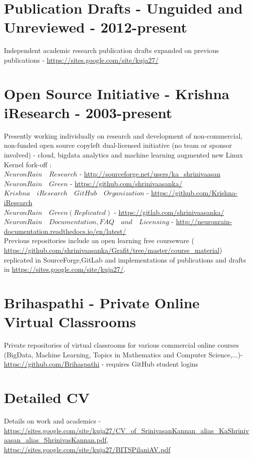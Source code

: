 \documentclass[11pt,onecolumn]{article}
\begin{document}
\section{Publication Drafts - Unguided and Unreviewed - 2012-present}
Independent academic research publication drafts expanded on previous publications - \url {https://sites.google.com/site/kuja27/}

\section{Open Source Initiative - Krishna iResearch - 2003-present}
Presently working individually on research and development of non-commercial, non-funded open source copyleft dual-licensed initiative (no team or sponsor involved) - cloud, bigdata analytics and machine learning augmented new Linux Kernel fork-off $:$ \\
 $NeuronRain \quad Research$ - \url {http://sourceforge.net/users/ka_shrinivaasan} \\
 $NeuronRain \quad Green$ - \url {https://github.com/shrinivaasanka/} \\
 $Krishna \quad iResearch \quad GitHub \quad Organization$ - \url {https://github.com/Krishna-iResearch} \\
  $NeuronRain \quad Green (Replicated)$ - \url {https://gitlab.com/shrinivaasanka/} \\
 $NeuronRain \quad Documentation, FAQ \quad and \quad Licensing$ - \url {http://neuronrain-documentation.readthedocs.io/en/latest/} \\
Previous repositories include an open learning free courseware ( \url {https://github.com/shrinivaasanka/Grafit/tree/master/course_material})  replicated in SourceForge,GitLab and implementations of publications and drafts in \url {https://sites.google.com/site/kuja27/}.

\section{Brihaspathi - Private Online Virtual Classrooms}
Private repositories of virtual classrooms for various commercial online courses (BigData, Machine Learning, Topics in Mathematics and Computer Science,...)- \url {https://github.com/Brihaspathi} - requires GitHub student logins 

\section{Detailed CV}
Details on work and academics - \url {https://sites.google.com/site/kuja27/CV\_of\_SrinivasanKannan\_alias\_KaShrinivaasan\_alias\_ShrinivasKannan.pdf}, \url {https://sites.google.com/site/kuja27/BITSPilaniAV.pdf}
\end{document}
